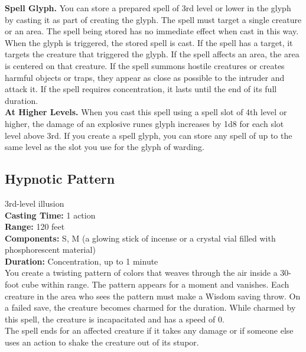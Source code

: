 \documentclass[11pt, A4paper, english]{article}
\begin{document}
\textbf{Spell Glyph.} You can store a prepared spell of 3rd level or lower in the glyph by casting it as part of creating the glyph. The spell must target a single creature or an area. The spell being stored has no immediate effect when cast in this way. When the glyph is triggered, the stored spell is cast. If the spell has a target, it targets the creature that triggered the glyph. If the spell affects an area, the area is centered on that creature. If the spell summons hostile creatures or creates harmful objects or traps, they appear as close as possible to the intruder and attack it. If the spell requires concentration, it lasts until the end of its full duration. \\
\textbf{At Higher Levels.} When you cast this spell using a spell slot of 4th level or higher, the damage of an explosive runes glyph increases by 1d8 for each slot level above 3rd. If you create a spell glyph, you can store any spell of up to the same level as the slot you use for the glyph of warding.

		\subsection{Hypnotic Pattern}
3rd-level illusion \\
\textbf{Casting Time:} 1 action \\
\textbf{Range:} 120 feet \\
\textbf{Components:} S, M (a glowing stick of incense or a crystal vial filled with phosphorescent material) \\
\textbf{Duration:} Concentration, up to 1 minute \\
You create a twisting pattern of colors that weaves through the air inside a 30-foot cube within range. The pattern appears for a moment and vanishes. Each creature in the area who sees the pattern must make a Wisdom saving throw. On a failed save, the creature becomes charmed for the duration. While charmed by this spell, the creature is incapacitated and has a speed of 0. \\
The spell ends for an affected creature if it takes any damage or if someone else uses an action to shake the creature out of its stupor.
\end{document}
